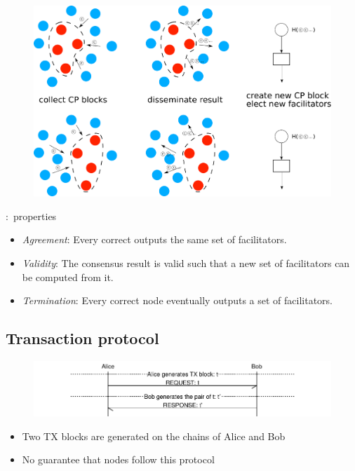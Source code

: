 \documentclass{beamer}
\begin{document}
\begin{frame}{\subsecname}
  \begin{figure}
    \includegraphics[width=1.0\textwidth]{consensus-overview}
    \centering
  \end{figure}
\end{frame}

\begin{frame}{\subsecname:~properties}
\label{def:consensus}
\begin{itemize}
    \item \emph{Agreement}:
        Every correct outputs the same set of facilitators.
    \item \emph{Validity}:
      The consensus result is valid such that a new set of facilitators can be computed from it.
    \item \emph{Termination}:
        Every correct node eventually outputs a set of facilitators.
\end{itemize}
\end{frame}

\subsection{Transaction protocol}
\begin{frame}{\subsecname}
  \begin{figure}[h]
  \includegraphics[width=1.0\textwidth]{tx-proto}
  \centering
  \end{figure}
\begin{itemize}
\item Two TX blocks are generated on the chains of Alice and Bob
\item No guarantee that nodes follow this protocol
\end{itemize}
\end{frame}
\end{document}
